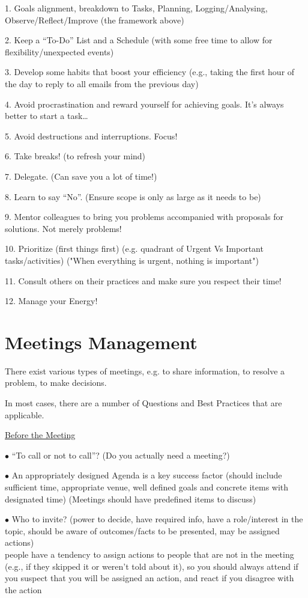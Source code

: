 \documentclass[]{project_plan}
\newcommand{\bulletPoint}{\hspace{-3.1pt}$\bullet$ \hspace{5pt}}
\begin{document}
1. Goals alignment, breakdown to Tasks, Planning, Logging/Analysing, Observe/Reflect/Improve (the framework above)

2. Keep a “To-Do” List and a Schedule (with some free time to allow for flexibility/unexpected events)

3. Develop some habits that boost your efficiency (e.g., taking the first hour of the day to reply to all emails from the previous day)

4. Avoid procrastination and reward yourself for achieving goals. It’s always better to start a task…

5. Avoid destructions and interruptions. Focus!

6. Take breaks! (to refresh your mind)

7. Delegate. (Can save you a lot of time!)

8. Learn to say “No”. (Ensure scope is only as large as it needs to be)

9. Mentor colleagues to bring you problems accompanied with proposals for solutions. Not merely problems!

10. Prioritize (first things first) (e.g. quadrant of Urgent Vs Important tasks/activities) ("When everything is urgent, nothing is important")

11. Consult others on their practices and make sure you respect their time!

12. Manage your Energy!

\section{Meetings Management}

There exist various types of meetings, e.g. to share information, to resolve a problem, to make
decisions.

In most cases, there are a number of Questions and Best Practices that are applicable.

\underline{Before the Meeting}

\bulletPoint “To call or not to call”? (Do you actually need a meeting?)

\bulletPoint  An appropriately designed Agenda is a key success factor (should include sufficient time, appropriate venue, well
defined goals and concrete items with designated time) (Meetings should have predefined items to discuss)

\bulletPoint  Who to invite? (power to decide, have required info, have a role/interest in the topic, should be aware of
outcomes/facts to be presented, may be assigned actions)\\
people have a tendency to assign actions to people that are not in the
meeting (e.g., if they skipped it or weren't told about it), so you should
always attend if you suspect that you will be assigned an action, and react if
you disagree with the action
\end{document}
